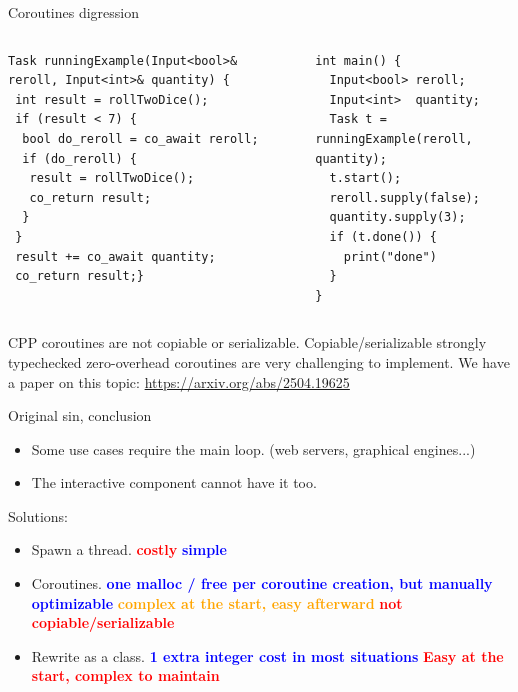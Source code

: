 \documentclass[aspectratio=169,11pt]{beamer}
\begin{document}
\begin{frame}{Coroutines digression}

\noindent
  \begin{columns}[T,onlytextwidth]
    \begin{column}{0.50\textwidth}
\begin{lstlisting}[style=cppstyle,numbers=none]
Task runningExample(Input<bool>& reroll, Input<int>& quantity) {
 int result = rollTwoDice();
 if (result < 7) {
  bool do_reroll = co_await reroll;
  if (do_reroll) {
   result = rollTwoDice();
   co_return result;               
  }
 }
 result += co_await quantity;
 co_return result;}
\end{lstlisting}
\end{column}
    \begin{column}{0.45\textwidth}
\begin{lstlisting}[style=cppstyle,numbers=none]
int main() {
  Input<bool> reroll;
  Input<int>  quantity;
  Task t = runningExample(reroll, quantity);
  t.start(); 
  reroll.supply(false); 
  quantity.supply(3);
  if (t.done()) {
    print("done") 
  }
}
\end{lstlisting}
    \end{column}
\end{columns}

CPP coroutines are not copiable or serializable. Copiable/serializable strongly typechecked zero-overhead coroutines are very challenging to implement.  We have a paper on this topic: \href{https://arxiv.org/abs/2504.19625} {https://arxiv.org/abs/2504.19625}

\end{frame}

\begin{frame}{Original sin, conclusion}
\begin{itemize}
    \item Some use cases require the main loop. (web servers, graphical engines...)
    \item The interactive component cannot have it too.

\end{itemize}
    \begin{block}{Solutions:}
\begin{itemize}
    \item Spawn a thread. \textbf{\textcolor{red}{costly}} \textbf{\textcolor{blue} {simple}}
    \item Coroutines. \textbf{\textcolor{blue}{one malloc / free per coroutine creation, but manually optimizable}} \textbf{\textcolor{orange}{complex at the start, easy afterward}} \textcolor{red}{\textbf{not copiable/serializable}}
    \item Rewrite as a class. \textbf{\textcolor{blue}{1 extra integer cost in most situations}} \textbf{\textcolor{red}{Easy at the start, complex to maintain}}
\end{itemize}
    \end{block}
\end{frame}
\end{document}
